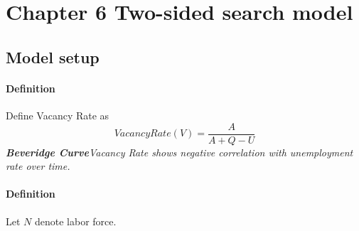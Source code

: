 \documentclass[11pt]{article}
\begin{document}
\section{Chapter 6 Two-sided search model}
\subsection{Model setup}
\paragraph{Definition} Define Vacancy Rate as
\[
	VacancyRate(V) = \frac{A}{A + Q - U}
\]
\emph{\textbf{Beveridge Curve}Vacancy Rate shows negative correlation with unemployment rate over time.}

\paragraph{Definition} Let $N$ denote labor force.
\end{document}
